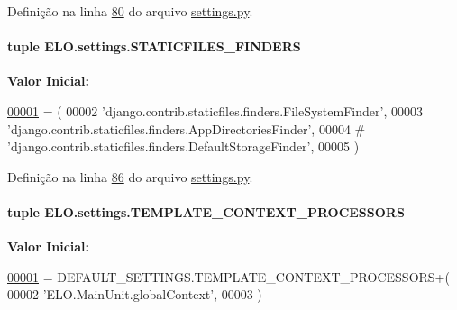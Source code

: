 Definição na linha \hyperlink{settings_8py_source_l00080}{80} do arquivo \hyperlink{settings_8py_source}{settings.\+py}.

\hypertarget{namespaceELO_1_1settings_a3e4decd51fab7bd5bdbdb12aac13b70a}{}
\paragraph[{S\+T\+A\+T\+I\+C\+F\+I\+L\+E\+S\+\_\+\+F\+I\+N\+D\+E\+R\+S}]{\setlength{\rightskip}{0pt plus 5cm}tuple E\+L\+O.\+settings.\+S\+T\+A\+T\+I\+C\+F\+I\+L\+E\+S\+\_\+\+F\+I\+N\+D\+E\+R\+S}\label{namespaceELO_1_1settings_a3e4decd51fab7bd5bdbdb12aac13b70a}
{\bfseries Valor Inicial\+:}
\begin{DoxyCode}
\hypertarget{namespaceELO_1_1settings_l00001}{}\hyperlink{namespaceELO_1_1settings}{00001} = (
00002     \textcolor{stringliteral}{'django.contrib.staticfiles.finders.FileSystemFinder'},
00003     \textcolor{stringliteral}{'django.contrib.staticfiles.finders.AppDirectoriesFinder'},
00004 \textcolor{comment}{#    'django.contrib.staticfiles.finders.DefaultStorageFinder',}
00005 )
\end{DoxyCode}


Definição na linha \hyperlink{settings_8py_source_l00086}{86} do arquivo \hyperlink{settings_8py_source}{settings.\+py}.

\hypertarget{namespaceELO_1_1settings_ad62b51880946e9380913c2f3811311bf}{}
\paragraph[{T\+E\+M\+P\+L\+A\+T\+E\+\_\+\+C\+O\+N\+T\+E\+X\+T\+\_\+\+P\+R\+O\+C\+E\+S\+S\+O\+R\+S}]{\setlength{\rightskip}{0pt plus 5cm}tuple E\+L\+O.\+settings.\+T\+E\+M\+P\+L\+A\+T\+E\+\_\+\+C\+O\+N\+T\+E\+X\+T\+\_\+\+P\+R\+O\+C\+E\+S\+S\+O\+R\+S}\label{namespaceELO_1_1settings_ad62b51880946e9380913c2f3811311bf}
{\bfseries Valor Inicial\+:}
\begin{DoxyCode}
\hypertarget{namespaceELO_1_1settings_l00001}{}\hyperlink{namespaceELO_1_1settings}{00001} = DEFAULT\_SETTINGS.TEMPLATE\_CONTEXT\_PROCESSORS+(
00002     \textcolor{stringliteral}{'ELO.MainUnit.globalContext'},
00003 )
\end{DoxyCode}


